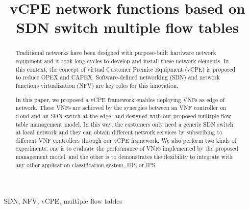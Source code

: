 \documentclass[conference]{IEEEtran}
\begin{document}
\title{vCPE network functions based on \\ SDN switch multiple flow tables}

\author{

}

\maketitle

\begin{abstract}
Traditional networks have been designed with purpose-built hardware network equipment and it took long cycles to develop and install these network elements. In this context, the concept of virtual Customer Premise Equipment (vCPE) is proposed to reduce OPEX and CAPEX. Software-defined networking (SDN) and network functions virtualization (NFV) are key roles for this innovation.

In this paper, we proposed a vCPE framework enables deploying VNFs as edge of network. These VNFs are achieved by the synergies between an VNF controller on cloud and an SDN switch at the edge, and designed with our proposed multiple flow table management model. In this way, the customers only need a generic SDN switch at local network and they can obtain different network services by subscribing to different VNF controllers through our vCPE framework. We also perform two kinds of experiments: one is to evaluate the performance of VNFs implemented by the proposed management model, and the other is to demonstrates the flexibility to integrate with any other application classification system, IDS or IPS



\end{abstract}

\begin{IEEEkeywords}
SDN, NFV, vCPE, multiple flow tables
\end{IEEEkeywords}

\IEEEpeerreviewmaketitle{}
\end{document}
